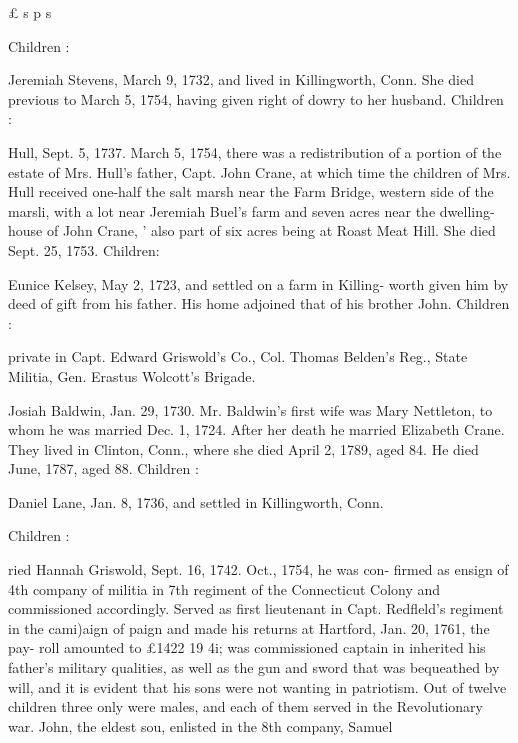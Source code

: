 \documentclass[oneside]{book}
\begin{document}
£ s p s 




Children : 







Jeremiah Stevens, March 9, 1732, and lived in Killingworth, 
Conn. She died previous to March 5, 1754, having given right 
of dowry to her husband. Children : 




Hull, Sept. 5, 1737. March 5, 1754, there was a redistribution 
of a portion of the estate of Mrs. Hull's father, Capt. John Crane, 
at which time the children of Mrs. Hull received one-half the salt 
marsh near the Farm Bridge, western side of the marsli, with a 
lot near Jeremiah Buel's farm and seven acres near the dwelling- 
house of John Crane, ' also part of six acres being at Roast Meat 
Hill. She died Sept. 25, 1753. Children: 









Eunice Kelsey, May 2, 1723, and settled on a farm in Killing- 
worth given him by deed of gift from his father. His home 
adjoined that of his brother John. Children : 








private in Capt. Edward Griswold's Co., Col. Thomas 
Belden's Reg., State Militia, Gen. Erastus Wolcott's Brigade. 


Josiah Baldwin, Jan. 29, 1730. Mr. Baldwin's first wife was 
Mary Nettleton, to whom he was married Dec. 1, 1724. After her 
death he married Elizabeth Crane. They lived in Clinton, Conn., 
where she died April 2, 1789, aged 84. He died June, 1787, 
aged 88. Children : 


Daniel Lane, Jan. 8, 1736, and settled in Killingworth, Conn. 

Children : 









ried Hannah Griswold, Sept. 16, 1742. Oct., 1754, he was con- 
firmed as ensign of 4th company of militia in 7th regiment of the 
Connecticut Colony and commissioned accordingly. Served as 
first lieutenant in Capt. Redfleld's regiment in the cami)aign of 
paign and made his returns at Hartford, Jan. 20, 1761, the pay- 
roll amounted to £1422  19  4i; was commissioned captain in 
inherited his father's military qualities, as well as the gun and 
sword that was bequeathed by will, and it is evident that his sons 
were not wanting in patriotism. Out of twelve children three 
only were males, and each of them served in the Revolutionary 
war. John, the eldest sou, enlisted in the 8th company, Samuel 
\end{document}
